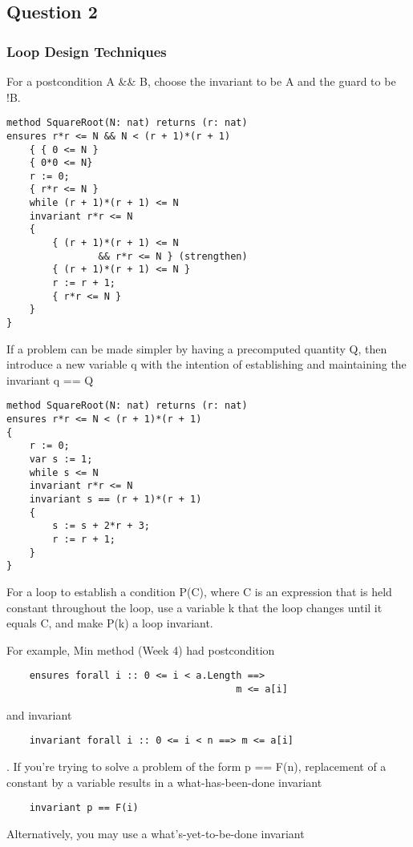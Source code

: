 \subsection{Question 2}
\subsubsection{Loop Design Techniques}
For a postcondition A \&\& B,
choose the invariant to be A and the guard to be !B.
\begin{verbatim}
method SquareRoot(N: nat) returns (r: nat)
ensures r*r <= N && N < (r + 1)*(r + 1)
    { { 0 <= N }
    { 0*0 <= N}
    r := 0;
    { r*r <= N }
    while (r + 1)*(r + 1) <= N
    invariant r*r <= N
    {
        { (r + 1)*(r + 1) <= N 
                && r*r <= N } (strengthen)
        { (r + 1)*(r + 1) <= N }
        r := r + 1;
        { r*r <= N }
    }
}
\end{verbatim}

If a problem can be made simpler by having a
precomputed quantity Q, then introduce a new
variable q with the intention of establishing and
maintaining the invariant q == Q

\begin{verbatim}
method SquareRoot(N: nat) returns (r: nat)
ensures r*r <= N < (r + 1)*(r + 1)
{
    r := 0;
    var s := 1;
    while s <= N
    invariant r*r <= N
    invariant s == (r + 1)*(r + 1)
    {
        s := s + 2*r + 3;
        r := r + 1;
    }
}
\end{verbatim}

For a loop to establish a condition P(C), where C is an
expression that is held constant throughout the loop,
use a variable k that the loop changes until it equals C,
and make P(k) a loop invariant.

For example, Min method (Week 4) had postcondition
\begin{verbatim}
    ensures forall i :: 0 <= i < a.Length ==>
                                        m <= a[i]
\end{verbatim}
and invariant
\begin{verbatim}
    invariant forall i :: 0 <= i < n ==> m <= a[i]
\end{verbatim}

.
If you're trying to solve a problem of the form
p == F(n), replacement of a constant by a variable
results in a what-has-been-done invariant
\begin{verbatim}
    invariant p == F(i)
\end{verbatim}
Alternatively, you may use a what's-yet-to-be-done
invariant

